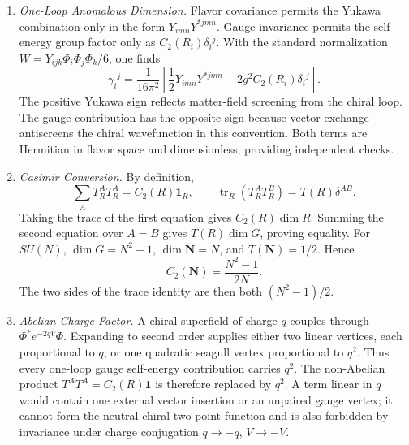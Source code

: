 \begin{enumerate}
  \begin{enumerate}
    \item \emph{One-Loop Anomalous Dimension.}
    Flavor covariance permits the Yukawa combination only in the form
      \(Y_{imn}Y^{*jmn}\).  Gauge invariance permits the self-energy group
      factor only as \(C_2(R_i)\delta_i{}^j\).  With the standard
      normalization \(W=Y_{ijk}\Phi_i\Phi_j\Phi_k/6\), one finds
      \[
        \gamma_i{}^j
          =\frac1{16\pi^2}
           \left[
             \frac12Y_{imn}Y^{*jmn}
             -2g^2C_2(R_i)\delta_i{}^j
           \right].
      \]
      The positive Yukawa sign reflects matter-field screening from the
      chiral loop.  The gauge contribution has the opposite sign because
      vector exchange antiscreens the chiral wavefunction in this
      convention.  Both terms are Hermitian in flavor space and
      dimensionless, providing independent checks.
    \item \emph{Casimir Conversion.}
    By definition,
      \[
        \sum_A T_R^AT_R^A=C_2(R)\mathbf1_R,
        \qquad
        \operatorname{tr}_R(T_R^AT_R^B)=T(R)\delta^{AB}.
      \]
      Taking the trace of the first equation gives
      \(C_2(R)\dim R\).  Summing the second equation over \(A=B\) gives
      \(T(R)\dim G\), proving equality.  For \(SU(N)\),
      \(\dim G=N^2-1\), \(\dim\mathbf N=N\), and
      \(T(\mathbf N)=1/2\).  Hence
      \[
        C_2(\mathbf N)=\frac{N^2-1}{2N}.
      \]
      The two sides of the trace identity are then both
      \((N^2-1)/2\).
    \item \emph{Abelian Charge Factor.}
    A chiral superfield of charge \(q\) couples through
      \(\Phi^*e^{-2qV}\Phi\).  Expanding to second order supplies either two
      linear vertices, each proportional to \(q\), or one quadratic seagull
      vertex proportional to \(q^2\).  Thus every one-loop gauge
      self-energy contribution carries \(q^2\).  The non-Abelian product
      \(T^AT^A=C_2(R)\mathbf{1}\) is therefore replaced by \(q^2\).
      A term linear in \(q\) would contain one external vector insertion or
      an unpaired gauge vertex; it cannot form the neutral chiral two-point
      function and is also forbidden by invariance under charge conjugation
      \(q\to-q\), \(V\to-V\).
  \end{enumerate}


\end{enumerate}
